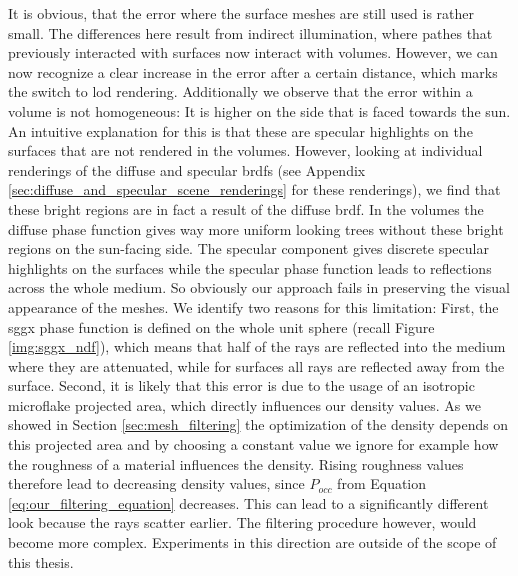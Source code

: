 It is obvious, that the error where the surface meshes are still used is rather small.
The differences here result from indirect illumination, where pathes that previously interacted with surfaces now interact with volumes.
However, we can now recognize a clear increase in the error after a certain distance, which marks the switch to \ac{lod} rendering.
Additionally we observe that the error within a volume is not homogeneous: It is higher on the side that is faced towards the sun.
An intuitive explanation for this is that these are specular highlights on the surfaces that are not rendered in the volumes.
However, looking at individual renderings of the diffuse and specular \acsp{brdf} (see Appendix \ref{sec:diffuse_and_specular_scene_renderings} for these renderings), we find that these bright regions are in fact a result of the diffuse \ac{brdf}.
In the volumes the diffuse phase function gives way more uniform looking trees without these bright regions on the sun-facing side.
The specular component gives discrete specular highlights on the surfaces while the specular phase function leads to reflections across the whole medium.
So obviously our approach fails in preserving the visual appearance of the meshes.
We identify two reasons for this limitation: First, the \ac{sggx} phase function is defined on the whole unit sphere (recall Figure \ref{img:sggx_ndf}), which means that half of the rays are reflected into the medium where they are attenuated, while for surfaces all rays are reflected away from the surface.
Second, it is likely that this error is due to the usage of an isotropic microflake projected area, which directly influences our density values.
As we showed in Section \ref{sec:mesh_filtering} the optimization of the density depends on this projected area and by choosing a constant value we ignore for example how the roughness of a material influences the density.
Rising roughness values therefore lead to decreasing density values, since $P_{occ}$ from Equation \ref{eq:our_filtering_equation} decreases.
This can lead to a significantly different look because the rays scatter earlier.
The filtering procedure however, would become more complex.
Experiments in this direction are outside of the scope of this thesis.


